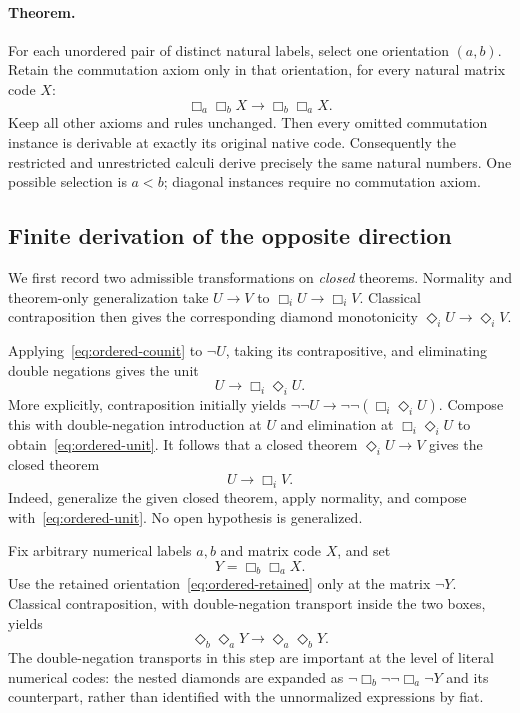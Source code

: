 \paragraph{Theorem.}
For each unordered pair of distinct natural labels, select one
orientation $(a,b)$.  Retain the commutation axiom only in that
orientation, for every natural matrix code $X$:
\begin{equation}
 \Box_a\Box_b X\to\Box_b\Box_a X.
 \label{eq:ordered-retained}
\end{equation}
Keep all other axioms and rules unchanged.  Then every omitted
commutation instance is derivable at exactly its original native code.
Consequently the restricted and unrestricted calculi derive precisely
the same natural numbers.  One possible selection is $a<b$; diagonal
instances require no commutation axiom.

\subsection{Finite derivation of the opposite direction}

We first record two admissible transformations on \emph{closed}
theorems.  Normality and theorem-only generalization take
$U\to V$ to $\Box_i U\to\Box_i V$.  Classical contraposition then
gives the corresponding diamond monotonicity
$\Diamond_i U\to\Diamond_i V$.

Applying~\eqref{eq:ordered-counit} to $\neg U$, taking its
contrapositive, and eliminating double negations gives the unit
\begin{equation}
 U\to\Box_i\Diamond_i U.
 \label{eq:ordered-unit}
\end{equation}
More explicitly, contraposition initially yields
$\neg\neg U\to\neg\neg(\Box_i\Diamond_i U)$.
Compose this with double-negation introduction at $U$ and elimination
at $\Box_i\Diamond_i U$ to obtain~\eqref{eq:ordered-unit}.
It follows that a closed theorem $\Diamond_i U\to V$ gives the
closed theorem
\begin{equation}
 U\to\Box_i V.
 \label{eq:ordered-adjunction}
\end{equation}
Indeed, generalize the given closed theorem, apply normality, and
compose with~\eqref{eq:ordered-unit}.  No open hypothesis is generalized.

Fix arbitrary numerical labels $a,b$ and matrix code $X$, and set
\[
 Y=\Box_b\Box_a X.
\]
Use the retained orientation~\eqref{eq:ordered-retained} only at the
matrix $\neg Y$.  Classical contraposition, with double-negation
transport inside the two boxes, yields
\begin{equation}
 \Diamond_b\Diamond_a Y\to\Diamond_a\Diamond_b Y.
 \label{eq:ordered-dual}
\end{equation}
The double-negation transports in this step are important at the level
of literal numerical codes: the nested diamonds are expanded as
$\neg\Box_b\neg\neg\Box_a\neg Y$ and its counterpart, rather
than identified with the unnormalized expressions by fiat.

